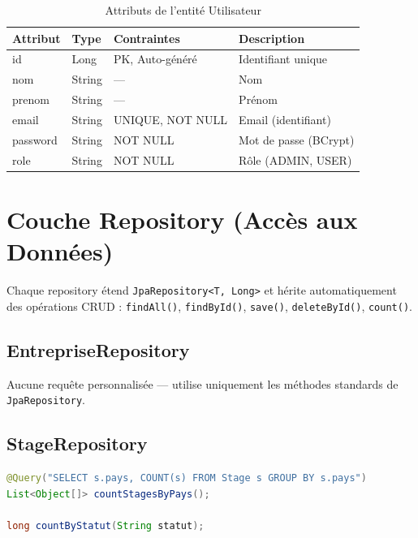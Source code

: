 \documentclass[12pt,a4paper]{report}
\begin{document}
\begin{table}[H]
\centering
\begin{tabular}{|l|l|l|p{5cm}|}
\hline
\textbf{Attribut} & \textbf{Type} & \textbf{Contraintes} & \textbf{Description} \\ \hline
id & Long & PK, Auto-généré & Identifiant unique \\ \hline
nom & String & --- & Nom \\ \hline
prenom & String & --- & Prénom \\ \hline
email & String & UNIQUE, NOT NULL & Email (identifiant) \\ \hline
password & String & NOT NULL & Mot de passe (BCrypt) \\ \hline
role & String & NOT NULL & Rôle (ADMIN, USER) \\ \hline
\end{tabular}
\caption{Attributs de l'entité Utilisateur}
\end{table}

\chapter{Couche Repository (Accès aux Données)}

Chaque repository étend \texttt{JpaRepository<T, Long>} et hérite automatiquement des opérations CRUD : \texttt{findAll()}, \texttt{findById()}, \texttt{save()}, \texttt{deleteById()}, \texttt{count()}.

\section{EntrepriseRepository}
Aucune requête personnalisée --- utilise uniquement les méthodes standards de \texttt{JpaRepository}.

\section{StageRepository}

\begin{lstlisting}[language=Java, caption=StageRepository --- Requêtes personnalisées]
@Query("SELECT s.pays, COUNT(s) FROM Stage s GROUP BY s.pays")
List<Object[]> countStagesByPays();

long countByStatut(String statut);
\end{lstlisting}
\end{document}
